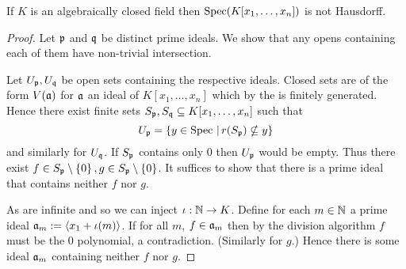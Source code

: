 \begin{prop}
    If $K$ is an algebraically closed field then 
    $\operatorname{Spec}(K[x_1,\dots,x_n])$ is not Hausdorff.
\end{prop}
\begin{proof}
    Let $\mathfrak{p}$ and $\mathfrak{q}$ be distinct prime ideals.
    We show that any opens containing 
    each of them have non-trivial intersection.

    Let $U_{\mathfrak{p}}, U_{\mathfrak{q}}$ be open sets containing the respective ideals.
    Closed sets are of the form $V(\mathfrak{a})$ for $\mathfrak{a}$ an ideal of 
    $K[x_1,\dots,x_n]$ which by the 
     is finitely generated.
    Hence there exist finite sets $S_{\mathfrak{p}},S_{\mathfrak{q}} \subseteq K[x_1,\dots,x_n]$
    such that
    \[U_{\mathfrak{p}} = \left\{y \in \operatorname{Spec} \,|\, r(S_{\mathfrak{p}}) \nsubseteq y\right\}\]
    and similarly for $U_{\mathfrak{q}}$.
    If $S_{\mathfrak{p}}$ contains only $0$ then $U_{\mathfrak{p}}$ would be empty.
    Thus there exist 
    $f \in S_{\mathfrak{p}} \setminus \left\{0\right\}, g \in S_{\mathfrak{p}} \setminus \left\{0\right\}$.
    It suffices to show that there is a prime ideal that contains neither 
    $f$ nor $g$.

    As  
    are infinite and so we can inject $\iota : \mathbb{N} \to K$.
    Define for each $m \in \mathbb{N}$ a prime ideal $\mathfrak{a}_m := \langle x_1 + \iota(m)\rangle$.
    If for all $m$, $f \in \mathfrak{a}_m$ then by the division algorithm $f$
    must be the $0$ polynomial, a contradiction. 
    (Similarly for $g$.) 
    Hence there is some ideal $\mathfrak{a}_m$ containing neither $f$ nor $g$.
\end{proof}